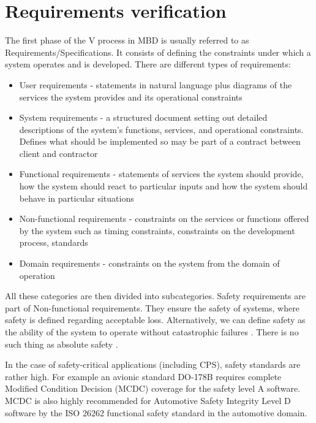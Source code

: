 \section{Requirements verification}

The first phase of the V process in MBD is usually referred to as Requirements/Specifications. It consists of defining the constraints under which a system operates and is developed. There are different types of requirements:

\begin{itemize}
    \item User requirements - statements in natural language plus diagrams of the services the system provides and its operational constraints
    \item System requirements - a structured document setting out detailed descriptions of the system’s functions, services, and operational constraints. Defines what should be implemented so may be part of a contract between client and contractor
    \item Functional requirements - statements of services the system should provide, how the system should react to particular inputs and how the system should behave in particular situations
    \item Non-functional requirements - constraints on the services or functions offered by the system such as timing constraints, constraints on the development process, standards
    \item Domain requirements - constraints on the system from the domain of operation
\end{itemize}

All these categories are then divided into subcategories. Safety requirements are part of Non-functional requirements. They ensure the safety of systems, where safety is defined regarding acceptable loss. Alternatively, we can define safety as the ability of the system to operate without catastrophic failures \cite{Sommerville:SoftwareEngineering}. There is no such thing as absolute safety \cite{Leveson:SystemSafety}.

In the case of safety-critical applications (including CPS), safety standards are rather high. For example an avionic standard DO-178B \cite{Maxey:AvionicStandardDO178B} requires complete Modified Condition Decision (MCDC) \cite{Chilenski:MCDC} coverage for the safety level A software. MCDC is also highly recommended for Automotive Safety Integrity Level D software by the ISO 26262 functional safety standard \cite{ISO26262} in the automotive domain.

